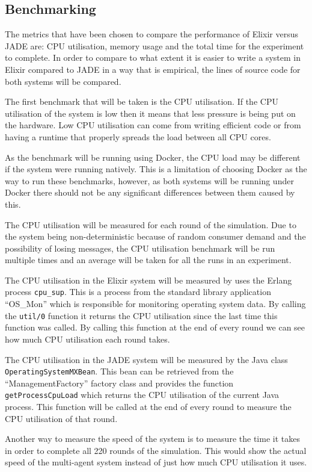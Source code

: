 \subsection{Benchmarking}

The metrics that have been chosen to compare the performance of Elixir versus JADE are: CPU utilisation, memory usage and the total time for the experiment to complete.
In order to compare to what extent it is easier to write a system in Elixir compared to JADE in a way that is empirical, the lines of source code for both systems will be compared.

The first benchmark that will be taken is the CPU utilisation.
If the CPU utilisation of the system is low then it means that less pressure is being put on the hardware.
Low CPU utilisation can come from writing efficient code or from having a runtime that properly spreads the load between all CPU cores.

As the benchmark will be running using Docker, the CPU load may be different if the system were running natively.
This is a limitation of choosing Docker as the way to run these benchmarks, however, as both systems will be running under Docker there should not be any significant differences between them caused by this.

The CPU utilisation will be measured for each round of the simulation.
Due to the system being non-deterministic because of random consumer demand and the possibility of losing messages, the CPU utilisation benchmark will be run multiple times and an average will be taken for all the runs in an experiment.

The CPU utilisation in the Elixir system will be measured by uses the Erlang process \verb|cpu_sup|.
This is a process from the standard library application ``OS\_Mon'' which is responsible for monitoring operating system data.
By calling the \verb|util/0| function it returns the CPU utilisation since the last time this function was called.
By calling this function at the end of every round we can see how much CPU utilisation each round takes.

The CPU utilisation in the JADE system will be measured by the Java class \verb|OperatingSystemMXBean|.
This bean can be retrieved from the ``ManagementFactory'' factory class and provides the function \verb|getProcessCpuLoad| which returns the CPU utilisation of the current Java process.
This function will be called at the end of every round to measure the CPU utilisation of that round.

Another way to measure the speed of the system is to measure the time it takes in order to complete all 220 rounds of the simulation.
This would show the actual speed of the multi-agent system instead of just how much CPU utilisation it uses.

